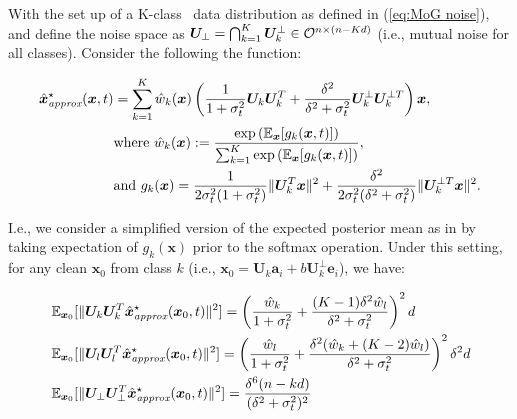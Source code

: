 \begin{lemma}\label{lem:decomp}
    With the set up of a K-class \MoLRG~data distribution as defined in (\ref{eq:MoG noise}), and define the noise space as $\bm U_{\perp} = \bigcap_{k=1}^K \bm U_k^{\perp} \in \mathcal{O}^{n \times (n-Kd)}$ (i.e., mutual noise for all classes). Consider the following the function:

    \begin{align}
        \hat{\bm x}_{\textit{approx}}^{\star}(\bm x, t) &=  \sum_{k=1}^K \hat{w}_k(\bm x) \left( \frac{1}{1 + \sigma_t^2} \bm U_k\bm U_k^T + \frac{\delta^2}{\delta^2 + \sigma_t^2} \bm U_k^{\perp}\bm U_k^{\perp T} \right) \bm x, \\
        &\text{where}\ \hat{w}_k(\bm x) := \frac{\exp\left( \operatorname{\mathbb{E}}_{\bm x} [g_k(\bm x, t)] \right)}{\sum_{k=1}^K \exp\left( \operatorname{\mathbb{E}}_{\bm x} [g_k(\bm x, t)] \right)}, \\
        &\text{and}\ g_k(\bm x) = \frac{1}{2\sigma_t^2 (1 + \sigma_t^2)} \|\bm U_k^T \bm x\|^2 + \frac{\delta^2}{2 \sigma_t^2 (\delta^2 + \sigma_t^2)} \| \bm U_k^{\perp T} \bm x \|^2 .
    \end{align}

    I.e., we consider a simplified version of the expected posterior mean as in  by taking expectation of $g_k(\bm x)$ prior to the softmax operation. Under this setting, for any clean $\bm x_0$ from class $k$ (i.e., $\bm x_0 = \bm U_k \bm a_i + b\bm U_k^{\perp} \bm e_i$), we have: 

    \begin{align}
        &\operatorname{\mathbb{E}}_{\bm x_0}[\| \bm U_k \bm U_k^T \hat{\bm x}_{\textit{approx}}^{\star}(\bm x_0, t)\|^2] = \left( \frac{\hat{w}_k}{1 + \sigma_t^2} + \frac{(K-1)\delta^2\hat{w}_l}{\delta^2+\sigma_t^2}\right)^2 d \label{eq:bin_correct}\\
        &\operatorname{\mathbb{E}}_{\bm x_0}[\| \bm U_l \bm U_l^T \hat{\bm x}_{\textit{approx}}^{\star}(\bm x_0, t)\|^2] = \left( \frac{\hat{w}_l}{1+\sigma_t^2} + \frac{\delta^2(\hat{w}_k + (K-2)\hat{w}_l)}{\delta^2 + \sigma_t^2} \right)^2 \delta^2 d \label{eq:bin_other}\\
        &\operatorname{\mathbb{E}}_{\bm x_0}[\| \bm U_{\perp} \bm U_{\perp}^T \hat{\bm x}_{\textit{approx}}^{\star}(\bm x_0, t)\|^2] = \frac{\delta^6 (n-kd)}{(\delta^2 + \sigma_t^2)^2} \label{eq:bin_noise_space} 
    \end{align}


\end{lemma}
